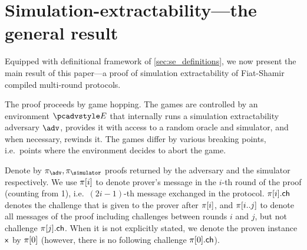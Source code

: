\section{Simulation-extractability---the general result}
\label{sec:general}
Equipped with definitional framework of \cref{sec:se_definitions}, we now present the main result of this paper---a proof of
simulation extractability of Fiat-Shamir compiled multi-round protocols.

The proof proceeds by game hopping. The games are controlled by an environment $\env$
that internally runs a simulation extractability adversary $\advse$, provides it
with access to a random oracle and simulator, and when necessary, rewinds it. The
games differ by various breaking points, i.e.~points where the environment
decides to abort the game.


Denote by $\zkproof_{\advse}, \zkproof_{\simulator}$ proofs returned by the
adversary and the simulator respectively. We use $\pi[i]$ to denote
prover's message in the $i$-th round of the proof (counting from 1),
i.e.~$(2i - 1)$-th message exchanged in the protocol. $\pi[i].\mathsf{ch}$ denotes
the challenge that is given to the prover after $\pi[i]$, and
$\pi[i..j]$ to denote all messages of the proof including challenges
between rounds $i$ and $j$, but not challenge $\pi[j].\mathsf{ch}$. When it is not
explicitly stated, we denote the proven instance $\mathsf{x}$ by $\pi[0]$
(however, there is no following challenge $\pi[0].\mathsf{ch}$).

